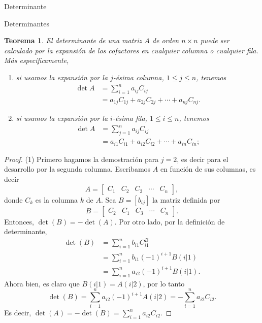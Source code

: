 \documentclass[a4paper,12pt,twoside,spanish,reqno]{amsbook}
\newtheorem{teorema}{Teorema}[section]
\theoremstyle{definition}
\theoremstyle{remark}
\begin{document}
\begin{chapter}{Determinante}
\begin{section}{Determinantes}
         \begin{teorema}\label{th-dessarrollo-por-columnas} El determinante de una matriz $A$ de orden $n \times n$ puede ser calculado por la expansión de los cofactores en  cualquier columna o cualquier fila. Más específicamente, 
             \begin{enumerate}
                 \item si usamos la expansión por la $j$-ésima columna, $1 \le j \le n$, tenemos
                 \begin{align*}
                 \det A &= \sum_{i=1}^{n} a_{ij} C_{ij} \\
                 & = a_{1j}C_{1j}+a_{2j}C_{2j}+\cdots+a_{nj}C_{nj}.
                 \end{align*} 
                 \item si usamos la expansión por la $i$-ésima fila, $1 \le i \le n$, tenemos
                 \begin{align*}
                 \det A &= \sum_{j=1}^{n} a_{ij} C_{ij} \\
                 & = a_{i1}C_{i1}+a_{i2}C_{i2}+\cdots+a_{in}C_{in};
                 \end{align*} 
             \end{enumerate}
         \end{teorema}
         \begin{proof} (1) Primero hagamos la demostración para $j=2$,  es decir para el desarrollo por la segunda columna.  Escribamos $A$ en función de sus columnas,  es decir 
             $$
             A = \begin{bmatrix}C_1& C_2&C_3 &\cdots& C_n\end{bmatrix},
             $$
             donde $C_k$  es la columna $k$ de $A$.
             Sea $B=[b_{ij}]$ la matriz definida por
             $$
             B = \begin{bmatrix} C_2 &C_1 &C_3 &\cdots &C_n\end{bmatrix}.
             $$
             Entonces, $\det(B) = -\det(A)$. Por otro lado, por la definición de determinante, 
             \begin{align*}
             \det(B) &=   \sum_{i=1}^{n} b_{i1} C^B_{i1} \\
             &= \sum_{i=1}^{n} b_{i1} (-1)^{i+1}B(i|1) \\
             & = \sum_{i=1}^{n} a_{i2} (-1)^{i+1}B(i|1).
             \end{align*} 
             Ahora bien, es claro que $B(i|1) = A(i|2)$, por lo tanto 
             $$
             \det(B)  = \sum_{i=1}^{n} a_{i2} (-1)^{i+1}A(i|2) = - \sum_{i=1}^{n} a_{i2} C_{i2}.
             $$
             Es decir, $\det(A) = -\det(B)= \sum_{i=1}^{n} a_{i2} C_{i2}$.
             

\end{proof}
\end{section}
\end{chapter}
\end{document}
